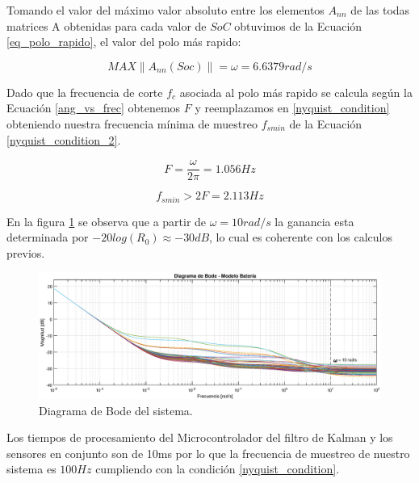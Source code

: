 \documentclass[10pt,a4paper]{article}
\begin{document}
Tomando el valor del máximo valor absoluto entre los elementos $A_{nn}$ de las
todas matrices A obtenidas para cada valor de $SoC$ obtuvimos de la Ecuación
\ref{eq_polo_rapido}, el valor del polo más rapido:

     \begin{equation}
     	MAX  \left \|A_{nn}(Soc)\right \| = \omega = 6.6379 rad/s
     	\label{eq_polo_rapido}
     \end{equation}

Dado que la frecuencia de corte $f_c$ asociada al polo más rapido se calcula
según la Ecuación \ref{ang_vs_frec} obtenemos $F$ y reemplazamos en
\ref{nyquist_condition} obteniendo nuestra frecuencia mínima de muestreo
$f_{smin}$ de la Ecuación \ref{nyquist_condition_2}.

\begin{equation}
	F = \frac{\omega}{2 \pi} = 1.056 Hz
	\label{ang_vs_frec}
\end{equation}

\begin{equation}
	f_{s min} > 2 F = 2.113 Hz
	\label{nyquist_condition_2}
\end{equation}

En la figura \ref{system_bode} se observa que a partir de $\omega = 10 rad/s$ la
ganancia esta determinada por $-20log(R_{0})\approx-30dB$, lo cual es coherente
con los calculos previos.

\begin{figure}[h!]
	\begin{center}
		\includegraphics[width=1\textwidth]{bode_amplitud_w_grid.eps}
		\caption{Diagrama de Bode del sistema.}
		\label{system_bode}
	\end{center}
\end{figure}
\FloatBarrier

Los tiempos de procesamiento del Microcontrolador del filtro de Kalman y los
sensores en conjunto son de 10ms por lo que la frecuencia de muestreo de nuestro
sistema es $100 Hz$ cumpliendo con la condición \ref{nyquist_condition}.
\end{document}
